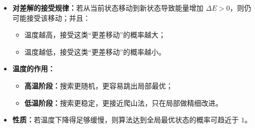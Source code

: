 \documentclass[../main.tex]{subfiles}
\begin{document}
\begin{enumerate}
\begin{itemize}
        \item \textbf{对差解的接受规律：}若从当前状态移动到新状态导致能量增加 $\Delta E>0$，则仍可能接受该移动；并且：
        \begin{itemize}
            \item 温度越高，接受这类“更差移动”的概率越大；
            \item 温度越低，接受这类“更差移动”的概率越小。
        \end{itemize}
        
        \item \textbf{温度的作用：}
        \begin{itemize}
            \item \textbf{高温阶段：}搜索更随机，更容易跳出局部最优；
            \item \textbf{低温阶段：}搜索更稳定，更接近爬山法，只在局部做精细改进。
        \end{itemize}
        
        \item \textbf{性质：}若温度下降得足够缓慢，则算法达到全局最优状态的概率可趋近于 $1$。
    \end{itemize}
\end{enumerate}
\end{document}
